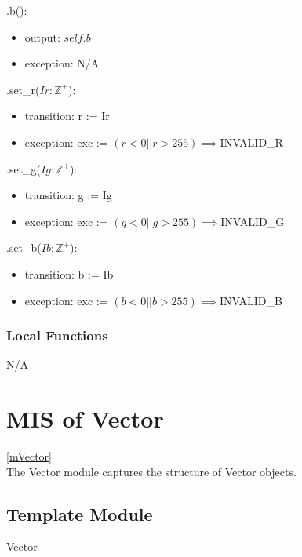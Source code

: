 \documentclass[12pt, titlepage]{article}
\begin{document}
\noindent .b():
\begin{itemize}
	\item output: $self.b$
	\item exception: N/A
\end{itemize} 

\noindent .set\_r($Ir: \mathbb{Z}^+$):
\begin{itemize}
	\item transition: r := Ir
	\item exception: exc := $(r < 0 || r > 255) \implies $INVALID\_R \\
\end{itemize}

\noindent .set\_g($Ig: \mathbb{Z}^+$):
\begin{itemize}
	\item transition: g := Ig
	\item exception: exc := $(g < 0 || g > 255) \implies $INVALID\_G \\
\end{itemize}

\noindent .set\_b($Ib: \mathbb{Z}^+$):
\begin{itemize}
	\item transition: b := Ib
	\item exception: exc := $(b < 0 || b > 255) \implies $INVALID\_B \\
\end{itemize}

\subsubsection{Local Functions}
N/A

\newpage

\section{MIS of Vector} \ref{mVector} \\
The Vector module captures the structure of Vector objects.

\subsection{Template Module}
Vector
\end{document}
